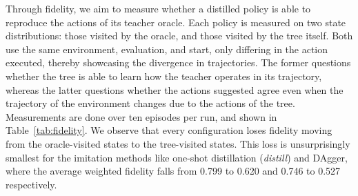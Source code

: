 Through fidelity, we aim to measure whether a distilled policy is able to reproduce the actions of its teacher oracle. Each policy is measured on two state distributions: those visited by the oracle, and those visited by the tree itself. Both use the same environment, evaluation, and start, only differing in the action executed, thereby showcasing the divergence in trajectories. The former questions whether the tree is able to learn how the teacher operates in its trajectory, whereas the latter questions whether the actions suggested agree even when the trajectory of the environment changes due to the actions of the tree. Measurements are done over ten episodes per run, and shown in Table~\ref{tab:fidelity}. We observe that every configuration loses fidelity moving from the oracle-visited states to the tree-visited states. This loss is unsurprisingly smallest for the imitation methods like one-shot distillation (\textit{distill}) and DAgger, where the average weighted fidelity falls from 0.799 to 0.620 and 0.746 to 0.527 respectively.

